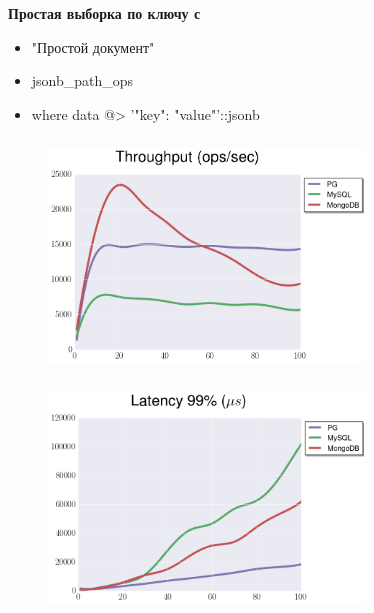\documentclass[usenames,dvipsnames, 18pt, compress, aspectratio=169]{beamer}
\begin{document}
\begin{frame}
    \frametitle{}
    \begin{center}
        \textbf{Простая выборка по ключу с}
        \begin{itemize}[label={}]
            \item "Простой документ"
            \item jsonb\_path\_ops
            \item where data @> '{"key": "value"}'::jsonb
        \end{itemize}
    \end{center}
\end{frame}

\begin{frame}
    \frametitle{}
    \begin{center}
    \begin{figure}
        \includegraphics[width=0.75\textwidth,center]{benchmarks/select_jsonb_path_ops_throughput.png}
    \end{figure}
    \end{center}
\end{frame}

\begin{frame}
    \frametitle{}
    \begin{center}
    \begin{figure}
        \includegraphics[width=0.75\textwidth,center]{benchmarks/select_jsonb_path_ops_latency_99.png}
    \end{figure}
    \end{center}
\end{frame}
\end{document}
